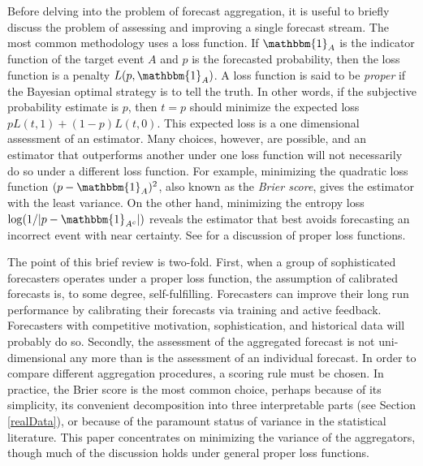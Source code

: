 \documentclass[12pt]{article}
\theoremstyle{definition}
\theoremstyle{definition}
\def\one{\mathbbm{1}}
\begin{document}
Before delving into the problem of forecast aggregation, it is useful
to briefly discuss the problem of assessing and improving a single
forecast stream.  The most common methodology uses a loss
function. If $\one_A$ is the indicator function of the target event
$A$ and $p$ is the forecasted probability, then the loss function is a penalty $L(p , \one_A)$.  A loss function is said to
be {\em proper} if the Bayesian optimal strategy is
to tell the truth.  In other words, if the subjective probability
estimate is $p$, then $t = p$ should minimize the expected loss $p
L(t,1) + (1-p) L(t,0)$.  This expected loss is a one dimensional
assessment of an estimator. Many choices, however, are possible, and
an estimator that outperforms another under one loss function will not
necessarily do so under a different loss function.  For example,
minimizing the quadratic loss function $(p - \one_A)^2$, also known as
the {\em Brier score}, gives the estimator with the least variance. On
the other hand, minimizing the entropy loss $\log (1 / |p -
\one_{A^c}|)$ reveals the estimator that best avoids forecasting an
incorrect event with near certainty. See  \cite{HwPe1997}
for a discussion of proper loss functions.

The point of this brief review is two-fold.  First, when a group of
sophisticated forecasters operates under a proper loss function,
the assumption of calibrated forecasts is, to some degree,
self-fulfilling.  Forecasters can improve their long run performance
by calibrating their forecasts via training and active
feedback. Forecasters with competitive
motivation, sophistication, and historical data will probably do so. Secondly, the
assessment of the aggregated forecast is not uni-dimensional any more
than is the assessment of an individual forecast.  In order to compare
different aggregation procedures, a scoring rule must be chosen.  In
practice, the Brier score is the most common choice, perhaps because
of its simplicity, its convenient decomposition into three
interpretable parts (see Section \ref{realData}), or because of the
paramount status of variance in the statistical literature. This paper concentrates on minimizing the variance of the aggregators, though
 much of the discussion holds under general proper loss
functions.
\end{document}
